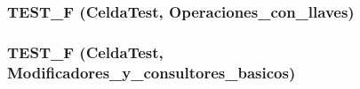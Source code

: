 \subsubsection{\setlength{\rightskip}{0pt plus 5cm}TEST\_\-F ({\bf CeldaTest}, Operaciones\_\-con\_\-llaves)}\label{testcelda_8cpp_8b44a4650c74eb4923d8e6f618626086}


\subsubsection{\setlength{\rightskip}{0pt plus 5cm}TEST\_\-F ({\bf CeldaTest}, Modificadores\_\-y\_\-consultores\_\-basicos)}\label{testcelda_8cpp_2a0f7a10fa53a2fed0d2ac4c4bf3562e}


